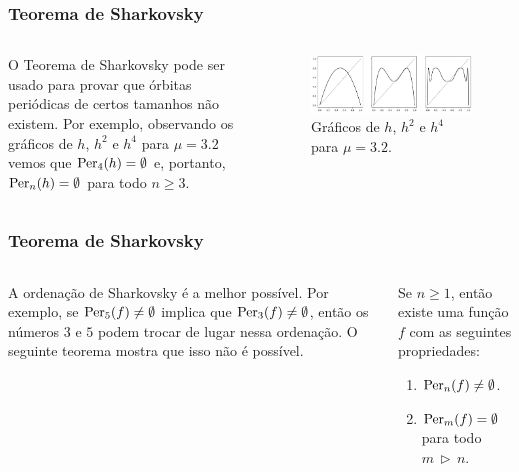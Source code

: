 
\begin{frame}
\vspace{5pt}
\frametitle{Teorema de Sharkovsky}
\begin{columns}
\column{\dimexpr\paperwidth-15pt}

O Teorema de Sharkovsky pode ser usado para provar que órbitas periódicas de certos tamanhos não existem. Por exemplo, observando os gráficos de $h$, $h^2$ e $h^4$ para $\mu = 3.2$ vemos que $\operatorname{Per}_4(h) = \emptyset$ e, portanto, $\operatorname{Per}_n(h) = \emptyset$ para todo $n \geq 3$.

\begin{figure}[!htb]
\centering
\includegraphics[scale=0.4]{images/h_3,2.png}
\caption{Gráficos de $h$, $h^2$ e $h^4$ para $\mu = 3.2$.}
\label{h_3,2}
\end{figure}

\end{columns}
\end{frame}


\begin{frame}
\vspace{5pt}
\frametitle{Teorema de Sharkovsky}
\begin{columns}
\column{\dimexpr\paperwidth-15pt}

A ordenação de Sharkovsky é a melhor possível. Por exemplo, se $\operatorname{Per}_5(f) \neq \emptyset$ implica que $\operatorname{Per}_3(f) \neq \emptyset$, então os números $3$ e $5$ podem trocar de lugar nessa ordenação. O seguinte teorema mostra que isso não é possível.

\begin{theorem}
Se $n \geq 1$, então existe uma função $f$ com as seguintes propriedades:
\begin{enumerate}
\item $\operatorname{Per}_n(f) \neq \emptyset$.
\item $\operatorname{Per}_m(f) =  \emptyset$ para todo $m \, \triangleright \, n$.
\end{enumerate}
\end{theorem}

\end{columns}
\end{frame}
